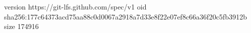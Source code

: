 version https://git-lfs.github.com/spec/v1
oid sha256:177c64373acd75aa88c0d0067a2918a7d33e8f22e07ef8c66a36f20c5fb3912b
size 174916
